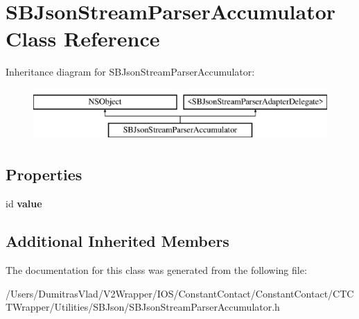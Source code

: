 \hypertarget{interface_s_b_json_stream_parser_accumulator}{\section{S\-B\-Json\-Stream\-Parser\-Accumulator Class Reference}
\label{interface_s_b_json_stream_parser_accumulator}
}
Inheritance diagram for S\-B\-Json\-Stream\-Parser\-Accumulator\-:\begin{figure}[H]
\begin{center}
\leavevmode
\includegraphics[height=2.000000cm]{interface_s_b_json_stream_parser_accumulator}
\end{center}
\end{figure}
\subsection*{Properties}
\begin{DoxyCompactItemize}
\item 
\hypertarget{interface_s_b_json_stream_parser_accumulator_a4ec442f555b8bb24cb2f20be59dd6ca6}{id {\bfseries value}}\label{interface_s_b_json_stream_parser_accumulator_a4ec442f555b8bb24cb2f20be59dd6ca6}

\end{DoxyCompactItemize}
\subsection*{Additional Inherited Members}


The documentation for this class was generated from the following file\-:\begin{DoxyCompactItemize}
\item 
/\-Users/\-Dumitras\-Vlad/\-V2\-Wrapper/\-I\-O\-S/\-Constant\-Contact/\-Constant\-Contact/\-C\-T\-C\-T\-Wrapper/\-Utilities/\-S\-B\-Json/S\-B\-Json\-Stream\-Parser\-Accumulator.\-h\end{DoxyCompactItemize}
